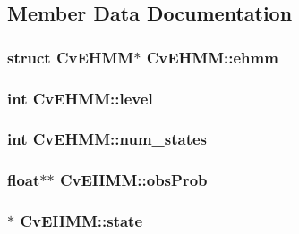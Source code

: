 \subsection{Member Data Documentation}
\hypertarget{structCvEHMM_ab1429de105e03466a3f91e0a4fcfaf0e}{
\subsubsection[{ehmm}]{\setlength{\rightskip}{0pt plus 5cm}struct {\bf Cv\-E\-H\-M\-M}$\ast$ Cv\-E\-H\-M\-M\-::ehmm}}\label{structCvEHMM_ab1429de105e03466a3f91e0a4fcfaf0e}
\hypertarget{structCvEHMM_aaa849276eb472066624aac17d07d363d}{
\subsubsection[{level}]{\setlength{\rightskip}{0pt plus 5cm}int Cv\-E\-H\-M\-M\-::level}}\label{structCvEHMM_aaa849276eb472066624aac17d07d363d}
\hypertarget{structCvEHMM_a76f8d6af057a30e38c7978ec3ca84f60}{
\subsubsection[{num\-\_\-states}]{\setlength{\rightskip}{0pt plus 5cm}int Cv\-E\-H\-M\-M\-::num\-\_\-states}}\label{structCvEHMM_a76f8d6af057a30e38c7978ec3ca84f60}
\hypertarget{structCvEHMM_a68625cb2d24219abe21121d038aa1cfb}{
\subsubsection[{obs\-Prob}]{\setlength{\rightskip}{0pt plus 5cm}float$\ast$$\ast$ Cv\-E\-H\-M\-M\-::obs\-Prob}}\label{structCvEHMM_a68625cb2d24219abe21121d038aa1cfb}
\hypertarget{structCvEHMM_a00849148e222b5fd626b39113651bc16}{
\subsubsection[{state}]{$\ast$ Cv\-E\-H\-M\-M\-::state}}\label{structCvEHMM_a00849148e222b5fd626b39113651bc16}
